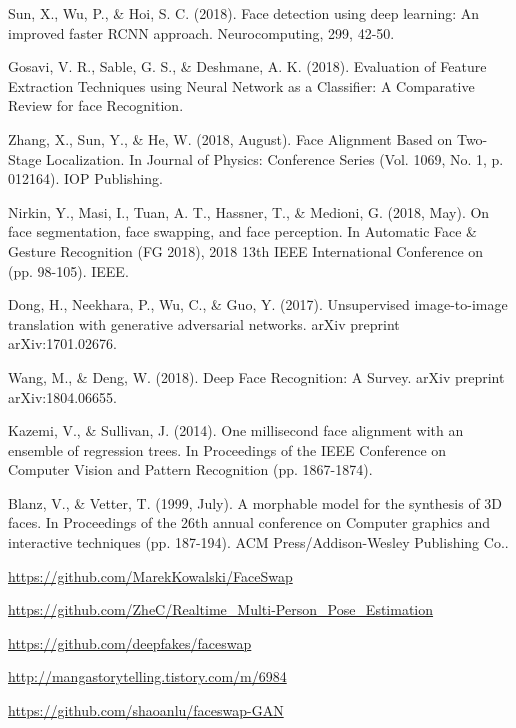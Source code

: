 \documentclass[chapter,oneside]{oblivoir}
\begin{document}
\begin{thebibliography}{}
    Sun, X., Wu, P., \& Hoi, S. C. (2018). Face detection using deep learning: An improved faster RCNN approach. Neurocomputing, 299, 42-50.
        
    Gosavi, V. R., Sable, G. S., \& Deshmane, A. K. (2018). Evaluation of Feature Extraction Techniques using Neural Network as a Classifier: A Comparative Review for face Recognition.

    Zhang, X., Sun, Y., \& He, W. (2018, August). Face Alignment Based on Two-Stage Localization. In Journal of Physics: Conference Series (Vol. 1069, No. 1, p. 012164). IOP Publishing.

    Nirkin, Y., Masi, I., Tuan, A. T., Hassner, T., \& Medioni, G. (2018, May). On face segmentation, face swapping, and face perception. In Automatic Face \& Gesture Recognition (FG 2018), 2018 13th IEEE International Conference on (pp. 98-105). IEEE.

    Dong, H., Neekhara, P., Wu, C., \& Guo, Y. (2017). Unsupervised image-to-image translation with generative adversarial networks. arXiv preprint arXiv:1701.02676.

    Wang, M., \& Deng, W. (2018). Deep Face Recognition: A Survey. arXiv preprint arXiv:1804.06655.

    Kazemi, V., \& Sullivan, J. (2014). One millisecond face alignment with an ensemble of regression trees. In Proceedings of the IEEE Conference on Computer Vision and Pattern Recognition (pp. 1867-1874).

    Blanz, V., \& Vetter, T. (1999, July). A morphable model for the synthesis of 3D faces. In Proceedings of the 26th annual conference on Computer graphics and interactive techniques (pp. 187-194). ACM Press/Addison-Wesley Publishing Co..

    \url{https://github.com/MarekKowalski/FaceSwap}

    \url{https://github.com/ZheC/Realtime_Multi-Person_Pose_Estimation}

    \url{https://github.com/deepfakes/faceswap}

    \url{http://mangastorytelling.tistory.com/m/6984}

    \url{https://github.com/shaoanlu/faceswap-GAN}

\end{thebibliography}
    
\end{document}
